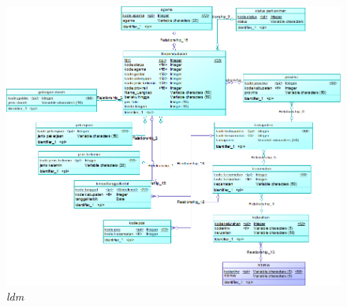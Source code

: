 \documentclass[12pt,a4paper,bahasa]{article}
\begin{document}
\begin{figure}[!htbp]
\centering
\includegraphics[scale=1.0]{gambar/ldm.png}
\caption{\textit{ldm}}
\label{ldm}
\end{figure}	
\end{document}
